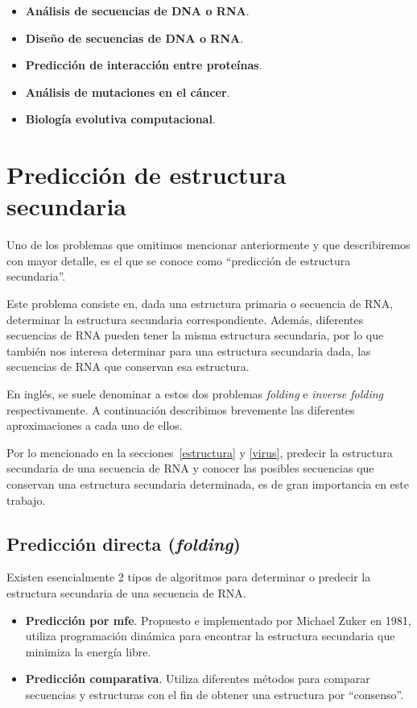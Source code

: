 \begin{itemize}
 \item \textbf{An\'alisis de secuencias de \ac{DNA} o \ac{RNA}}.
 \item \textbf{Dise\~no de secuencias de \ac{DNA} o \ac{RNA}}.
 \item \textbf{Predicci\'on de interacci\'on entre prote\'inas}.
 \item \textbf{An\'alisis de mutaciones en el c\'ancer}.
 \item \textbf{Biolog\'ia evolutiva computacional}.
\end{itemize}

\section{Predicci\'on de estructura secundaria}

Uno de los problemas que omitimos mencionar anteriormente y que describiremos
con mayor detalle, es el que se conoce como ``predicci\'on de estructura
secundaria''. 

Este problema consiste en, dada una estructura primaria o secuencia de \ac{RNA},
determinar la estructura secundaria correspondiente. Adem\'as, diferentes
secuencias de \ac{RNA} pueden tener la misma estructura secundaria, por lo que
tambi\'en nos interesa determinar para una estructura secundaria dada, las
secuencias de \ac{RNA} que conservan esa estructura. 

En ingl\'es, se suele denominar a estos dos problemas \textit{folding} e
\textit{inverse folding} respectivamente. A continuaci\'on describimos
brevemente las diferentes aproximaciones a cada uno de ellos.

Por lo mencionado en la secciones~\ref{estructura} y \ref{virus}, predecir la
estructura secundaria de una secuencia de \ac{RNA} y conocer las posibles
secuencias que conservan una estructura secundaria determinada, es de gran
importancia en este trabajo.

\subsection{Predicci\'on directa (\textit{folding})}
\label{folding}
Existen esencialmente 2 tipos de algoritmos para determinar o predecir la
estructura secundaria de una secuencia de \ac{RNA}.

\begin{itemize} 
 \item \textbf{Predicci\'on por \ac{mfe}}. Propuesto e implementado por Michael
Zuker en 1981\cite{Zuker81}, utiliza programaci\'on din\'amica para encontrar la
estructura secundaria que minimiza la energ\'ia libre.
 \item \textbf{Predicci\'on comparativa}. Utiliza diferentes m\'etodos para
comparar secuencias y estructuras con el fin de obtener una estructura por
``consenso''\cite{Gardner04}.
\end{itemize}

